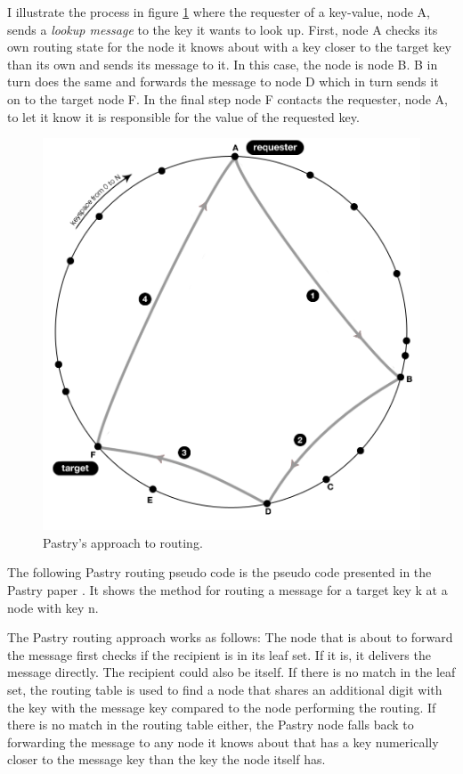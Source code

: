 I illustrate the process in figure \ref{figRoutingPastry} where the requester of a key-value, node A, sends a \emph{lookup message} to the key it wants to look up. First, node A checks its own routing state for the node it knows about with a key closer to the target key than its own and sends its message to it. In this case, the node is node B. B in turn does the same and forwards the message to node D which in turn sends it on to the target node F. In the final step node F contacts the requester, node A, to let it know it is responsible for the value of the requested key. 

\begin{figure}[!htb]
\begin{center}
	\includegraphics[width=0.9\linewidth]{illustrations/PastryRoutingSuccess.png}
  \caption{Pastry's approach to routing.}
  \label{figRoutingPastry}
\end{center}
\end{figure}

The following Pastry routing pseudo code is the pseudo code presented in the Pastry paper \cite{pastry}. 
It shows the method for routing a message for a target key k at a node with key n.

The Pastry routing approach works as follows: The node that is about to forward the message first checks if the recipient is in its leaf set. If it is, it delivers the message directly. The recipient could also be itself.
If there is no match in the leaf set, the routing table is used to find a node that shares an additional digit with the key with the message key compared to the node performing the routing. If there is no match in the routing table either, the Pastry node falls back to forwarding the message to any node it knows about that has a key numerically closer to the message key than the key the node itself has.

